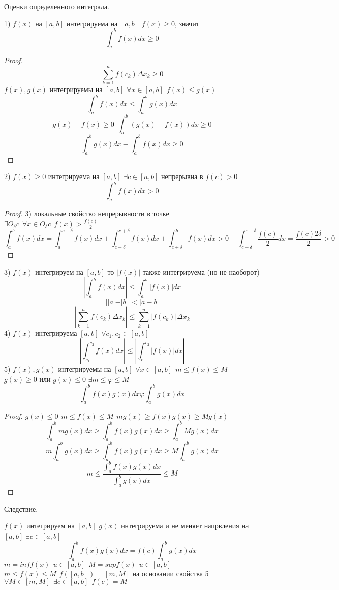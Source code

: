 \begin{title}[\Large]
    Оценки определенного интеграла.
\end{title}
1) $f(x)$ на $[a, b]$ интегрируема на $[a, b]$ $f(x) \ge 0$, значит
\[\int_a^b f(x)dx \ge 0\]
\begin{proof}
    \[\sum_{k=1}^{n} f(c_k)\Delta x_k \ge 0\]
    $f(x), g(x)$ интегрируемы на $[a, b]$ $\forall x \in [a, b] ~~ f(x)\le g(x)$
    \[\int_a^b f(x)dx \le \int_a^b g(x)dx\]
    \[g(x) - f(x) \ge 0 ~~ \int_a^b (g(x) - f(x))dx \ge 0\]
    \[\int_a^b g(x)dx - \int_a^b f(x)dx \ge 0\]
\end{proof}
2) $f(x) \ge 0$ интегрируема на $[a, b]$ $\exists c \in [a, b]$ непрерывна в
$f(c) > 0$ \[\int_a^b f(x)dx > 0\]
\begin{proof}
    3) локальные свойство непрерывности в точке $\exists O_{\delta}c ~~
    \forall x \in O_{\delta}c ~~ f(x) > \frac{f(c)}{2}$
    \[
        \int_a^b f(x)dx = \int_a^{c-\delta} f(x)dx +
        \int_{c-\delta}^{c+\delta} f(x)dx + \int_{c+\delta}^b f(x)dx >
        0 + \int_{c-\delta}^{c+\delta} \frac{f(c)}{2}dx
        = \frac{f(c) 2\delta}{2} > 0
    \]
\end{proof}
3) $f(x)$ интегрируем на $[a, b]$ то $|f(x)|$ также интегрируема
(но не наоборот)
\[\left| \int_a^b f(x)dx \right| \le \int_a^b |f(x)|dx\]
\[||a| - |b|| < |a - b|\]
\[
    \left| \sum_{k=1}^n f(c_k)\Delta x_k \right| \le
    \sum_{k=1}^{n}|f(c_k)|\Delta x_k
\]
4) $f(x)$ интегрируема $[a, b]$ $\forall c_1, c_2 \in [a, b]$
\[
    \left| \int_{c_1}^{c_2} f(x)dx \right| \le
    \left| \int_{c_1}^{c_2} |f(x)|dx \right|
\]
5) $f(x), g(x)$ интегрируемы на $[a, b]$ $\forall x \in [a, b] ~~
m \le f(x) \le M$ $g(x) \ge 0$ или $g(x) \le 0$ $\exists m \le \varphi \le M$
\[\int_a^b f(x)g(x)dx \varphi \int_a^b g(x)dx\]
\begin{proof}
    $g(x) \le 0 ~~ m \le f(x) \le M ~~ mg(x) \ge f(x)g(x) \ge Mg(x)$
    \[\int_a^b mg(x)dx \ge \int_a^b f(x)g(x)dx \ge \int_a^b Mg(x)dx\]
    \[m\int_a^b g(x)dx \ge \int_a^b f(x)g(x)dx \ge M\int_a^b g(x)dx\]
    \[m \le \frac{\int_a^b f(x)g(x)dx}{\int_a^b g(x)dx} \le M\]
\end{proof}

Следствие.\\
\begin{theorem}
    $f(x)$ интегрируем на $[a, b]$ $g(x)$ интегрируема и не меняет напрвления на
    $[a, b]$ $\exists c \in [a, b]$
    \[\int_a^b f(x)g(x)dx  = f(c) \int_a^b g(x)dx\]
    $m = inf f(x) ~~ u \in [a, b] ~~ M = sup f(x) ~~ u \in [a, b]$
    $m \le f(x) \le M ~~ f([a, b]) = [m, M]$ на основании свойства 5
    $\forall M \in [m, M] ~~ \exists c \in [a, b] ~~ f(c) = M$
\end{theorem}